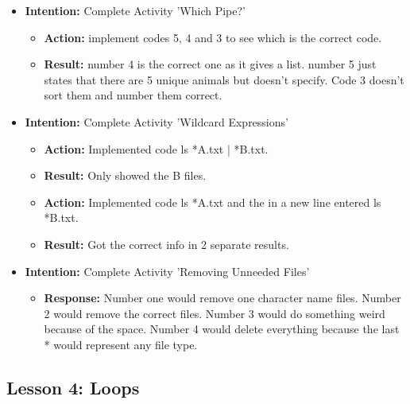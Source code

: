 \documentclass{article}
\begin{document}
\begin{itemize}
\item{\textbf{Intention:} Complete Activity 'Which Pipe?'}

\begin{itemize}
\item{\textbf{Action:} implement codes 5, 4 and 3 to see which is the correct code.}

\item{\textbf{Result:} number 4 is the correct one as it gives a list. number 5 just states that there are 5 unique animals but doesn't specify. Code 3 doesn't sort them and number them correct.}

\end{itemize}

\item{\textbf{Intention:} Complete Activity 'Wildcard Expressions'}

\begin{itemize}
\item{\textbf{Action:} Implemented code ls *A.txt | *B.txt.}

\item{\textbf{Result:} Only showed the B files.}

\item{\textbf{Action:} Implemented code ls *A.txt and the in a new line entered ls *B.txt.}

\item{\textbf{Result:} Got the correct info in 2 separate results.}

\end{itemize}

\item{\textbf{Intention:} Complete Activity 'Removing Unneeded Files'}

\begin{itemize}
\item{\textbf{Response:} Number one would remove one character name files. Number 2 would remove the correct files. Number 3 would do something weird because of the space. Number 4 would delete everything because the last * would represent any file type.}


\end{itemize}

\end{itemize}

\subsection{Lesson 4: Loops}
\end{document}
